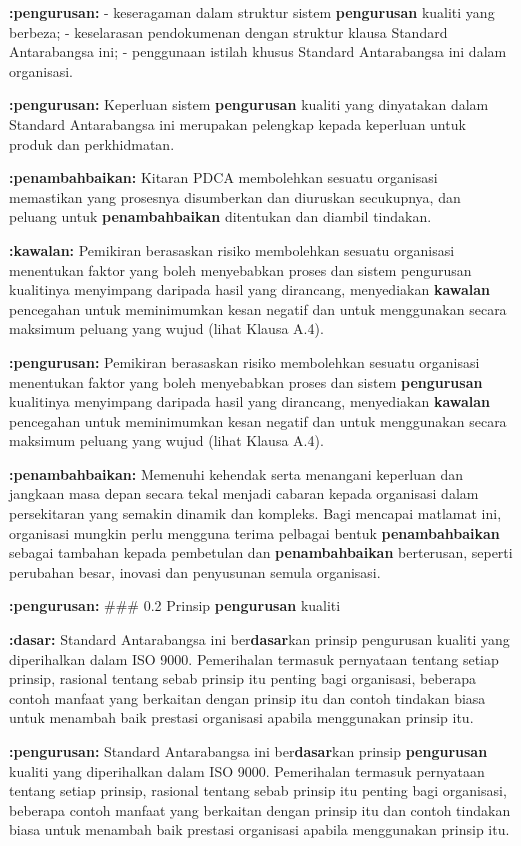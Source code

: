 \documentclass{article}
\begin{document}
\textbf{:pengurusan:} - keseragaman dalam struktur sistem \textbf{pengurusan} kualiti yang berbeza;
- keselarasan pendokumenan dengan struktur klausa Standard Antarabangsa ini;
- penggunaan istilah khusus Standard Antarabangsa ini dalam organisasi.

\textbf{:pengurusan:} Keperluan sistem \textbf{pengurusan} kualiti yang dinyatakan dalam Standard Antarabangsa ini
merupakan pelengkap kepada keperluan untuk produk dan perkhidmatan.

\textbf{:penambahbaikan:} Kitaran PDCA membolehkan sesuatu organisasi memastikan yang prosesnya disumberkan
dan diuruskan secukupnya, dan peluang untuk \textbf{penambahbaikan} ditentukan dan diambil
tindakan.

\textbf{:kawalan:} Pemikiran berasaskan risiko membolehkan sesuatu organisasi menentukan faktor yang boleh
menyebabkan proses dan sistem pengurusan kualitinya menyimpang daripada hasil yang
dirancang, menyediakan \textbf{kawalan} pencegahan untuk meminimumkan kesan negatif dan
untuk menggunakan secara maksimum peluang yang wujud (lihat Klausa A.4).

\textbf{:pengurusan:} Pemikiran berasaskan risiko membolehkan sesuatu organisasi menentukan faktor yang boleh
menyebabkan proses dan sistem \textbf{pengurusan} kualitinya menyimpang daripada hasil yang
dirancang, menyediakan \textbf{kawalan} pencegahan untuk meminimumkan kesan negatif dan
untuk menggunakan secara maksimum peluang yang wujud (lihat Klausa A.4).

\textbf{:penambahbaikan:} Memenuhi kehendak serta menangani keperluan dan jangkaan masa depan secara tekal
menjadi cabaran kepada organisasi dalam persekitaran yang semakin dinamik dan kompleks.
Bagi mencapai matlamat ini, organisasi mungkin perlu mengguna terima pelbagai bentuk
\textbf{penambahbaikan} sebagai tambahan kepada pembetulan dan \textbf{penambahbaikan} berterusan,
seperti perubahan besar, inovasi dan penyusunan semula organisasi.

\textbf{:pengurusan:} \#\#\# 0.2 Prinsip \textbf{pengurusan} kualiti

\textbf{:dasar:} Standard Antarabangsa ini ber\textbf{dasar}kan prinsip pengurusan kualiti yang diperihalkan dalam
ISO 9000. Pemerihalan termasuk pernyataan tentang setiap prinsip, rasional tentang sebab
prinsip itu penting bagi organisasi, beberapa contoh manfaat yang berkaitan dengan prinsip
itu dan contoh tindakan biasa untuk menambah baik prestasi organisasi apabila
menggunakan prinsip itu.

\textbf{:pengurusan:} Standard Antarabangsa ini ber\textbf{dasar}kan prinsip \textbf{pengurusan} kualiti yang diperihalkan dalam
ISO 9000. Pemerihalan termasuk pernyataan tentang setiap prinsip, rasional tentang sebab
prinsip itu penting bagi organisasi, beberapa contoh manfaat yang berkaitan dengan prinsip
itu dan contoh tindakan biasa untuk menambah baik prestasi organisasi apabila
menggunakan prinsip itu.
\end{document}
